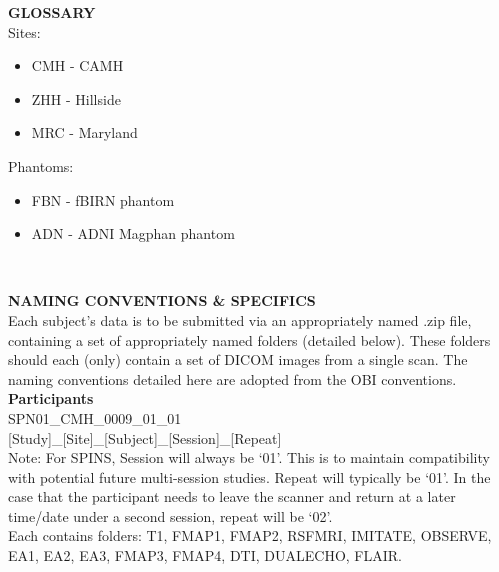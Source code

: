 \documentclass[a4paper,11pt,oneside]{book}
\newcommand\headings{
\noindent
\large
\leftskip=0.15in
\textbf
}
\newcommand\stepsL{
    \noindent
    \leftskip=0.15in
    \small
}
\newcommand\namingL{
    \small
    \noindent
    \leftskip=0in
    \textbf
}
\newcommand\namingexampleL{
    \noindent
    \leftskip=0.15in
    \small
}
\begin{document}
\begin{multicols}{2}
{%
\columnbreak

\headings{GLOSSARY} \\

\stepsL{Sites:}
\stepsL{\begin{itemize}  
            \item{CMH - CAMH}  
            \item{ZHH - Hillside}  
            \item{MRC - Maryland}  
        \end{itemize}
        }


\stepsL{Phantoms:}
\stepsL{\begin{itemize}  
            \item{FBN - fBIRN phantom} 
            \item{ADN - ADNI Magphan phantom}
        \end{itemize}
        } \



%
\headings{NAMING CONVENTIONS \& SPECIFICS}\\

\stepsL{Each subject's data is to be submitted via an appropriately named .zip file, containing a set of appropriately named folders (detailed below). These folders should each (only) contain a set of DICOM images from a single scan. The naming conventions detailed here are adopted from the OBI conventions.} \\

%

\namingL{Participants} \\
\namingexampleL{SPN01\_CMH\_0009\_01\_01}\\
\namingexampleL{[Study]\_[Site]\_[Subject]\_[Session]\_[Repeat]}\\

\stepsL{Note: For SPINS, Session will always be `01'. This is to maintain compatibility with potential future multi-session studies. Repeat will typically be `01'. In the case that the participant needs to leave the scanner and return at a later time/date under a second session, repeat will be `02'.}\\

\stepsL{Each contains folders: T1, FMAP1, FMAP2, RSFMRI, IMITATE, OBSERVE, EA1, EA2, EA3, FMAP3, FMAP4, DTI, DUALECHO, FLAIR.}\\

}
\end{multicols}
\end{document}

